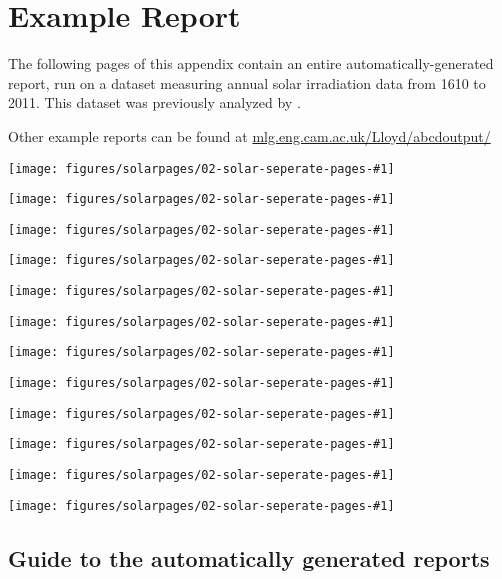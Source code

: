 \chapter{Example Report}
\label{ch:example-solar}

The following pages of this appendix contain an entire automatically-generated report, run on a dataset measuring annual solar irradiation data from 1610 to 2011.
This dataset was previously analyzed by \citet{lean1995reconstruction}.

Other example reports can be found at \url{mlg.eng.cam.ac.uk/Lloyd/abcdoutput/}

\newcommand{\solarreportpage}[1]{\texttt{[image: figures/solarpages/02-solar-seperate-pages-\#1]}}

\clearpage


\solarreportpage{2}

\solarreportpage{3}

\solarreportpage{4}

\solarreportpage{5}

\solarreportpage{6}

\solarreportpage{7}

\solarreportpage{8}

\solarreportpage{9}

\solarreportpage{10}

\solarreportpage{11}

\solarreportpage{12}

\solarreportpage{13}












\outbpdocument{


}


\iffalse

\section{Guide to the automatically generated reports}

